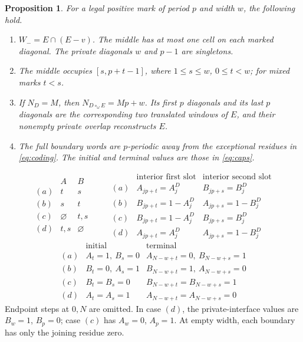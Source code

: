 \documentclass[11pt,a4paper]{amsart}
\numberwithin{equation}{section}
\theoremstyle{plain}
\newtheorem{proposition}[theorem]{Proposition}
\theoremstyle{definition}
\begin{document}
\begin{proposition}\label{prop:local-data}
For a legal positive mark of period \(p\) and width \(w\), the following hold.
\begin{enumerate}
\item \(W_-=E\cap(E-v)\).  The middle has at most one cell on each marked
 diagonal.  The private diagonals \(w\) and \(p-1\) are singletons.
\item The middle occupies \([s,p+t-1]\), where \(1\le s\le w\), \(0\le t<w\);
 for mixed marks \(t<s\).
\item If \(N_D=M\), then \(N_{D\circ_\omega E}=Mp+w\).  Its first \(p\) diagonals
 and its last \(p\) diagonals are the corresponding two translated windows of
 \(E\), and their nonempty private overlap reconstructs \(E\).
\item The full boundary words are \(p\)-periodic away from the exceptional
 residues in \eqref{eq:coding}.  The initial and terminal values are those
 in \eqref{eq:caps}.
\end{enumerate}
\end{proposition}
\begin{equation}\label{eq:coding}
\begin{array}{c|cc}
 & A & B\\\hline
(a)&t&s\\
(b)&s&t\\
(c)&\varnothing&t,s\\
(d)&t,s&\varnothing
\end{array}
\qquad
\begin{array}{c|cc}
 &\text{interior first slot}&\text{interior second slot}\\\hline
(a)&A_{jp+t}=A_j^D&B_{jp+s}=B_j^D\\
(b)&B_{jp+t}=1-A_j^D&A_{jp+s}=1-B_j^D\\
(c)&B_{jp+t}=1-A_j^D&B_{jp+s}=B_j^D\\
(d)&A_{jp+t}=A_j^D&A_{jp+s}=1-B_j^D
\end{array}
\end{equation}
\begin{equation}\label{eq:caps}
\begin{array}{c|l|l}
 &\text{initial}&\text{terminal}\\\hline
(a)&A_t=1,\ B_s=0&A_{N-w+t}=0,\ B_{N-w+s}=1\\
(b)&B_t=0,\ A_s=1&B_{N-w+t}=1,\ A_{N-w+s}=0\\
(c)&B_t=B_s=0&B_{N-w+t}=B_{N-w+s}=1\\
(d)&A_t=A_s=1&A_{N-w+t}=A_{N-w+s}=0
\end{array}
\end{equation}
Endpoint steps at \(0,N\) are omitted.  In case \((d)\), the private-interface
values are \(B_w=1\), \(B_p=0\); case \((c)\) has \(A_w=0\), \(A_p=1\).
At empty width, each boundary has only the joining residue zero.
\end{document}

